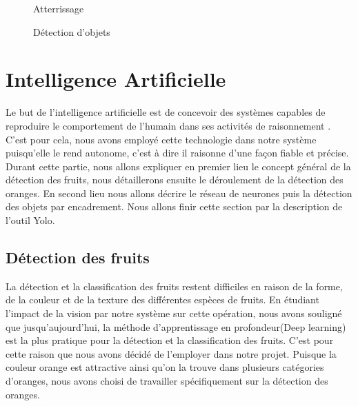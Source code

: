 \begin{figure}[H]
\begin{minipage}{0.49\textwidth}
	\hspace{0.8cm}
	\caption{Atterrissage }
	
\end{minipage}
\begin{minipage}{0.49\textwidth}
	\hspace{0.6cm}
	\caption{Détection d'objets }
	
\end{minipage}
\end{figure}
\section{Intelligence Artificielle}
Le but de l'intelligence artificielle est de concevoir des systèmes capables de reproduire le comportement de l'humain dans ses activités de raisonnement \cite{PowerPoint}. C'est pour cela, nous avons employé cette technologie dans notre système puisqu'elle le rend autonome, c'est à dire il raisonne d'une façon fiable et précise. 
Durant cette partie, nous allons expliquer en premier lieu le concept général de la détection des fruits, nous détaillerons ensuite le déroulement de la détection des oranges. En second lieu nous allons décrire le réseau de neurones puis la détection des objets par encadrement. Nous allons finir cette section par la description de l'outil Yolo. 

\subsection{Détection des fruits}
La détection et la classification des fruits restent difficiles en raison de la forme, de la couleur et de la texture des différentes espèces de fruits. En étudiant l'impact de la vision par notre système sur cette opération, nous avons souligné que jusqu'aujourd'hui, la méthode d'apprentissage en profondeur(Deep learning) est la plus pratique pour la détection et la classification des fruits. C'est pour cette raison que nous avons décidé de l'employer dans notre projet. Puisque la couleur orange est attractive ainsi qu'on la trouve dans plusieurs catégories d'oranges, nous avons choisi de travailler spécifiquement sur la détection des oranges.
